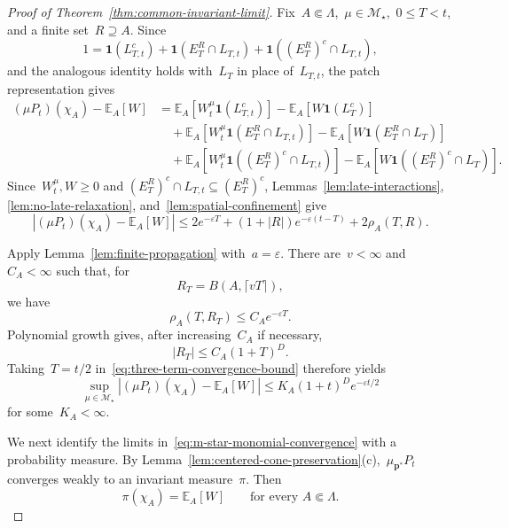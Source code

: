 \documentclass[EJP,preprint,NODS,nobera]{ejpecp}
\newcommand{\E}{\mathbb{E}}
\newcommand{\bb}[1]{\left(#1\right)}
\newcommand{\Cb}[1]{\left[#1\right]}
\newcommand{\abs}[1]{\left|#1\right|}
\newcommand{\ind}{\mathbf{1}}
\newcommand{\mb}[1]{\mathbf{#1}}
\begin{document}
\begin{proof}[Proof of Theorem~\ref{thm:common-invariant-limit}]
Fix~$A\Subset\Lambda$,~$\mu\in\mathcal M_\star$,~$0\leq T<t$, and a
finite set~$R\supseteq A$. Since
\begin{equation*}
1
=
\ind\bb{L_{T,t}^c}
+
\ind\bb{E_T^R\cap L_{T,t}}
+
\ind\bb{(E_T^R)^c\cap L_{T,t}},
\end{equation*}
and the analogous identity holds with~$L_T$ in place of~$L_{T,t}$, the patch
representation gives
\begin{align*}
(\mu P_t)(\chi_A)-\E_A\Cb{W}
&=
\E_A\Cb{W_t^\mu\ind\bb{L_{T,t}^c}}
-
\E_A\Cb{W\ind\bb{L_T^c}}
\\
&\quad+
\E_A\Cb{W_t^\mu\ind\bb{E_T^R\cap L_{T,t}}}
-
\E_A\Cb{W\ind\bb{E_T^R\cap L_T}}
\\
&\quad+
\E_A\Cb{W_t^\mu\ind\bb{(E_T^R)^c\cap L_{T,t}}}
-
\E_A\Cb{W\ind\bb{(E_T^R)^c\cap L_T}}.
\end{align*}
Since~$W_t^\mu,W\geq0$ and
$(E_T^R)^c\cap L_{T,t}\subseteq(E_T^R)^c$, Lemmas~\ref{lem:late-interactions},
\ref{lem:no-late-relaxation}, and~\ref{lem:spatial-confinement} give
\begin{equation}
\label{eq:three-term-convergence-bound}
\abs{(\mu P_t)(\chi_A)-\E_A\Cb{W}}
\leq
2e^{-\varepsilon T}
+
\bb{1+\abs R}e^{-\varepsilon\bb{t-T}}
+
2\rho_A(T,R).
\end{equation}

Apply Lemma~\ref{lem:finite-propagation} with~$a=\varepsilon$. There are~$v<\infty$ and~$C_A<\infty$ such that, for
\begin{equation*}
R_T
=
B\bb{A,\lceil vT\rceil},
\end{equation*}
we have
\begin{equation*}
\rho_A(T,R_T)
\leq
C_Ae^{-\varepsilon T}.
\end{equation*}
Polynomial growth gives, after increasing~$C_A$ if necessary,
\begin{equation*}
\abs{R_T}
\leq
C_A(1+T)^D.
\end{equation*}
Taking~$T=t/2$ in~\eqref{eq:three-term-convergence-bound} therefore yields
\begin{equation}
\label{eq:m-star-monomial-convergence}
\sup_{\mu\in\mathcal M_\star}
\abs{
(\mu P_t)(\chi_A)
-
\E_A\Cb{W}
}
\leq
K_A(1+t)^D e^{-\varepsilon t/2}
\end{equation}
for some~$K_A<\infty$.

We next identify the limits in~\eqref{eq:m-star-monomial-convergence} with a
probability measure. By Lemma~\ref{lem:centered-cone-preservation}\textup{(c)},~$\mu_{\mb p^*}P_t$ converges weakly to an invariant measure~$\pi$. Then
\begin{equation}
\label{eq:pi-patch-moments}
\pi(\chi_A)
=
\E_A\Cb{W}
\qquad
\text{for every }A\Subset\Lambda.
\end{equation}


\end{proof}
\end{document}

